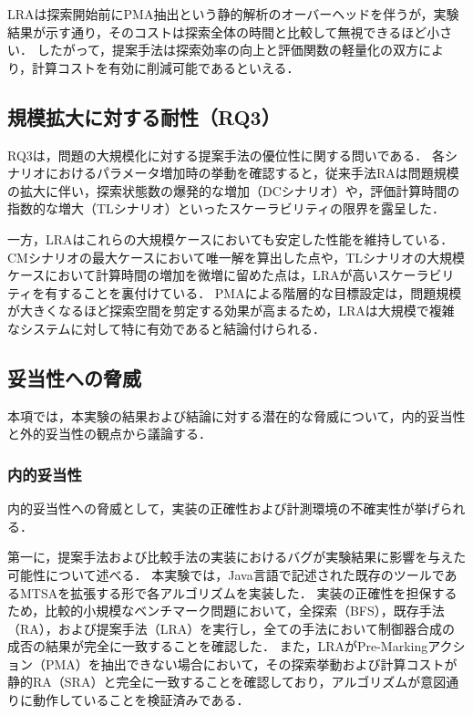 \documentclass[a4paper,11pt,oneside,openany,report,dvipdfmx]{jsbook}
\begin{document}
LRAは探索開始前にPMA抽出という静的解析のオーバーヘッドを伴うが，実験結果が示す通り，そのコストは探索全体の時間と比較して無視できるほど小さい．
したがって，提案手法は探索効率の向上と評価関数の軽量化の双方により，計算コストを有効に削減可能であるといえる．

\subsection{規模拡大に対する耐性（RQ3）}

RQ3は，問題の大規模化に対する提案手法の優位性に関する問いである．
各シナリオにおけるパラメータ増加時の挙動を確認すると，従来手法RAは問題規模の拡大に伴い，探索状態数の爆発的な増加（DCシナリオ）や，評価計算時間の指数的な増大（TLシナリオ）といったスケーラビリティの限界を露呈した．

一方，LRAはこれらの大規模ケースにおいても安定した性能を維持している．
CMシナリオの最大ケースにおいて唯一解を算出した点や，TLシナリオの大規模ケースにおいて計算時間の増加を微増に留めた点は，LRAが高いスケーラビリティを有することを裏付けている．
PMAによる階層的な目標設定は，問題規模が大きくなるほど探索空間を剪定する効果が高まるため，LRAは大規模で複雑なシステムに対して特に有効であると結論付けられる．

\subsection{妥当性への脅威}

本項では，本実験の結果および結論に対する潜在的な脅威について，内的妥当性と外的妥当性の観点から議論する．

\subsubsection{内的妥当性}

内的妥当性への脅威として，実装の正確性および計測環境の不確実性が挙げられる．

第一に，提案手法および比較手法の実装におけるバグが実験結果に影響を与えた可能性について述べる．
本実験では，Java言語で記述された既存のツールであるMTSAを拡張する形で各アルゴリズムを実装した．
実装の正確性を担保するため，比較的小規模なベンチマーク問題において，全探索（BFS），既存手法（RA），および提案手法（LRA）を実行し，全ての手法において制御器合成の成否の結果が完全に一致することを確認した．
また，LRAがPre-Markingアクション（PMA）を抽出できない場合において，その探索挙動および計算コストが静的RA（SRA）と完全に一致することを確認しており，アルゴリズムが意図通りに動作していることを検証済みである．
\end{document}
